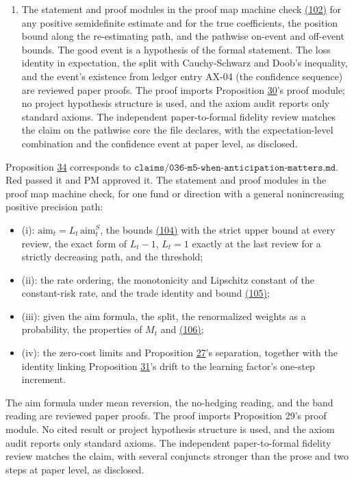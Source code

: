 \documentclass[11pt]{article}
\begin{document}
\begin{enumerate}
  \item The statement and proof modules in the proof map machine check
\hyperref[eq:102]{(102)} for any positive semidefinite estimate and for the true
coefficients, the position bound along the re-estimating path, and
the pathwise on-event and off-event bounds. The good event is a
hypothesis of the formal statement. The loss identity in expectation,
the split with Cauchy-Schwarz and Doob's inequality, and the event's
existence from ledger entry AX-04 (the confidence sequence) are
reviewed paper proofs. The proof imports Proposition \hyperref[res:Proposition-30]{30}'s proof
module; no project hypothesis structure is used, and the axiom audit
reports only standard axioms. The independent paper-to-formal
fidelity review matches the claim on the pathwise core the file
declares, with the expectation-level combination and the confidence
event at paper level, as disclosed.
\end{enumerate}

Proposition \hyperref[res:Proposition-34]{34} corresponds to
\(\texttt{claims/036-m5-when-anticipation-matters.md}\). Red passed it and
PM approved it. The statement and proof modules in the proof map
machine check, for one fund or direction with a general nonincreasing
positive precision path:

\begin{itemize}
  \item (i): \(\mathrm{aim}_t=L_t\,\mathrm{aim}^S_t\), the bounds \hyperref[eq:104]{(104)} with the strict upper
  bound at every review, the exact form of \(L_t-1\), \(L_t=1\) exactly at the
  last review for a strictly decreasing path, and the threshold;
  \item (ii): the rate ordering, the monotonicity and Lipschitz constant of
  the constant-risk rate, and the trade identity and bound \hyperref[eq:105]{(105)};
  \item (iii): given the aim formula, the split, the renormalized weights as
  a probability, the properties of \(M_t\) and \hyperref[eq:106]{(106)};
  \item (iv): the zero-cost limits and Proposition \hyperref[res:Proposition-27]{27}'s separation, together
  with the identity linking Proposition \hyperref[res:Proposition-31]{31}'s drift to the learning
  factor's one-step increment.
\end{itemize}

The aim formula under mean reversion, the no-hedging reading, and the
band reading are reviewed paper proofs. The proof imports Proposition
29's proof module. No cited result or project hypothesis structure is
used, and the axiom audit reports only standard axioms. The
independent paper-to-formal fidelity review matches the claim, with
several conjuncts stronger than the prose and two steps at paper level,
as disclosed.
\end{document}
